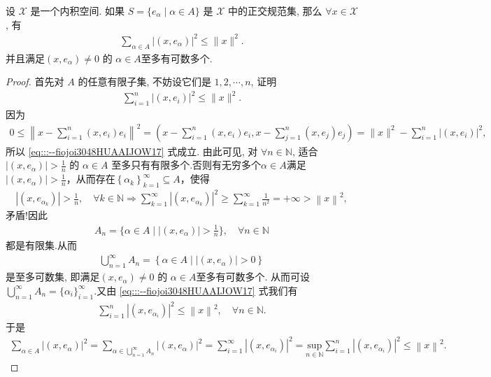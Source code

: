 \documentclass[../../main.tex]{subfiles}%
\begin{document}
\begin{theorem}[Bessel不等式]\label{theorem:泛函分析---Bessel不等式}
设 $\mathscr{X}$ 是一个内积空间. 如果 $S=\{e_\alpha\mid\alpha\in A\}$ 是 $\mathscr{X}$ 中的正交规范集, 那么 $\forall x\in\mathscr{X}$, 有
\begin{align}
\sum\limits_{\alpha\in A}|(x,e_\alpha)|^2\leqslant\|x\|^2.\label{eq:::--fiojoi3048HUAAIJOW16}
\end{align}
并且满足$(x,e_\alpha)\neq 0$ 的 $\alpha\in A$至多有可数多个. 
\end{theorem}
\begin{proof}

首先对 $A$ 的任意有限子集, 不妨设它们是 $1,2,\cdots,n$, 证明
\begin{align}
\sum\limits_{i=1}^n|(x,e_i)|^2\leqslant\|x\|^2.\label{eq:::--fiojoi3048HUAAIJOW17}
\end{align}
因为
\begin{align*}
0\leqslant\left\|x-\sum\limits_{i=1}^n(x,e_i)e_i\right\|^2
=\left(x-\sum\limits_{i=1}^n(x,e_i)e_i,x-\sum\limits_{j=1}^n(x,e_j)e_j\right)=\|x\|^2-\sum\limits_{i=1}^n|(x,e_i)|^2,
\end{align*}
所以 \eqref{eq:::--fiojoi3048HUAAIJOW17} 式成立. 由此可见, 对 $\forall n\in\mathbb{N}$, 适合 $|(x,e_\alpha)|>\frac{1}{n}$ 的 $\alpha\in A$ 至多只有有限多个.否则有无穷多个$\alpha \in A$满足$\left| \left( x,e_{\alpha} \right) \right|>\frac{1}{n}$，从而存在$\left\{ \alpha _k \right\} _{k=1}^{\infty}\subseteq A$，使得
\begin{align*}
\left| \left( x,e_{\alpha _k} \right) \right|>\frac{1}{n},\quad \forall k\in \mathbb{N} \Longrightarrow \sum\limits_{k=1}^{\infty}{\left| \left( x,e_{\alpha _k} \right) \right|^2}\geqslant \sum\limits_{k=1}^{\infty}{\frac{1}{n^2}}=+\infty >\left\| x \right\| ^2,
\end{align*}
矛盾!因此
\begin{align*}
A_n=\{\alpha \in A\mid \left| \left( x,e_{\alpha} \right) \right|>\frac{1}{n}\},\quad \forall n\in \mathbb{N}
\end{align*}
都是有限集.从而
\begin{align*}
\bigcup_{n=1}^{\infty}{A_n}=\left\{ \alpha \in A\mid \left| \left( x,e_{\alpha} \right) \right|>0 \right\} 
\end{align*}
是至多可数集,
即满足$(x,e_\alpha)\neq 0$ 的 $\alpha\in A$至多有可数多个. 从而可设$\bigcup_{n=1}^{\infty}{A_n}=\{\alpha_i\}_{i=1}^{\infty}$.又由 \eqref{eq:::--fiojoi3048HUAAIJOW17} 式我们有
\begin{align*}
\sum_{i=1}^n{\left| \left( x,e_{\alpha _i} \right) \right|^2}\leqslant \left\| x \right\| ^2,\quad \forall n\in \mathbb{N} .
\end{align*}
于是
\begin{align*}
\sum_{\alpha \in A}{\left| \left( x,e_{\alpha} \right) \right|^2}=\sum_{\alpha \in \bigcup_{n=1}^{\infty}{A_n}}{\left| \left( x,e_{\alpha} \right) \right|^2}=\sum_{i=1}^{\infty}{\left| \left( x,e_{\alpha _i} \right) \right|^2}=\underset{n\in \mathbb{N}}{\mathrm{sup}}\sum_{i=1}^n{\left| \left( x,e_{\alpha _i} \right) \right|^2}\leqslant \left\| x \right\| ^2.
\end{align*}

\end{proof}
\end{document}
